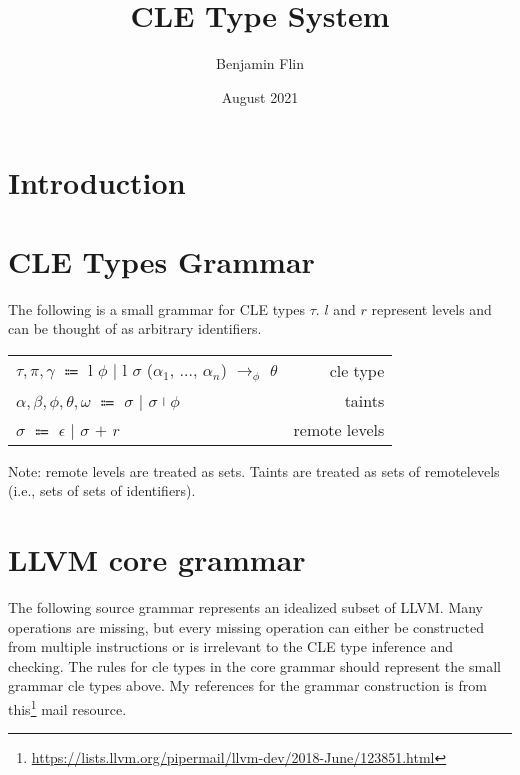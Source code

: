 \documentclass{article}
\title{CLE Type System}
\author{Benjamin Flin}
\date{August 2021}
\newcommand{\vertrule}[1][1ex]{\rule{.4pt}{#1}}
\begin{document}
\maketitle

\section{Introduction}
\section{CLE Types Grammar}
The following is a small grammar for CLE types $\tau$. 
$l$ and $r$ represent levels and can be thought of as arbitrary identifiers.

\begin{center}
\begin{tabular}{ l r }
    $\tau, \pi, \gamma$ $\Coloneqq$ l $\phi$ $\bigl\vert$ l $\sigma$ ($\alpha_1$, $\dots$, $\alpha_n$) $\rightarrow_\phi$ $\theta$ & cle type \\
    $\alpha, \beta, \phi, \theta, \omega$ $\Coloneqq$ $\sigma$ $\bigl\vert$ $\sigma$ $\vertrule[1.5ex]$ $\phi$ & taints \\
    $\sigma$ $\Coloneqq$ $\epsilon$ $\bigl\vert$ $\sigma$ $+$ $r$ & remote levels \\
\end{tabular}
\end{center}
Note: remote levels are treated as sets. Taints are treated as sets of remotelevels (i.e., sets of sets of identifiers).

\section{LLVM core grammar}

The following source grammar represents an idealized subset of LLVM. 
Many operations are missing, but every missing operation can either be constructed from multiple instructions or is irrelevant to the CLE type inference and checking. 
The rules for cle types in the core grammar should represent the small grammar cle types above.
My references for the grammar construction is from this\footnote{\url{https://lists.llvm.org/pipermail/llvm-dev/2018-June/123851.html}} mail resource.
\end{document}
